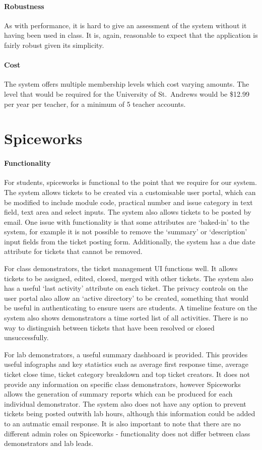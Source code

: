 \paragraph{Robustness}
As with performance, it is hard to give an assessment of the system without it having been used in class. It is, again, reasonable to expect that the application is fairly robust given its simplicity.


\paragraph{Cost}  
The system offers multiple membership levels which cost varying amounts. The level that would be required for the University of St.\ Andrews would be \$12.99 per year per teacher, for a minimum of 5 teacher accounts.

\newpage
\section{Spiceworks}

\paragraph{Functionality}
For students, spiceworks is functional to the point that we require for our system. The system allows tickets to be created via a customisable user portal, which can be modified to include module code, practical number and issue category in text field, text area and select inputs. The system also allows tickets to be posted by email. One issue with functionality is that some attributes are `baked-in' to the system, for example it is not possible to remove the `summary' or `description' input fields from the ticket posting form. Additionally, the system has a due date attribute for tickets that cannot be removed.

For class demonstrators, the ticket management UI functions well. It allows tickets to be assigned, edited, closed, merged with other tickets. The system also has a useful `last activity' attribute on each ticket. The privacy controls on the user portal also allow an `active directory' to be created, something that would be useful in authenticating to ensure users are students. A timeline feature on the system also shows demonstrators a time sorted list of all activities. There is no way to distinguish between tickets that have been resolved or closed unsuccessfully. 

For lab demonstrators, a useful summary dashboard is provided. This provides useful infographs and key statistics such as average first response time, average ticket close time, ticket category breakdown and top ticket creators. It does not provide any information on specific class demonstrators, however Spiceworks allows the generation of summary reports which can be produced for each individual demonstrator. The system also does not have any option to prevent tickets being posted outwith lab hours, although this information could be added to an autmatic email response. It is also important to note that there are no different admin roles on Spiceworks - functionality does not differ between class demonstrators and lab leads.


